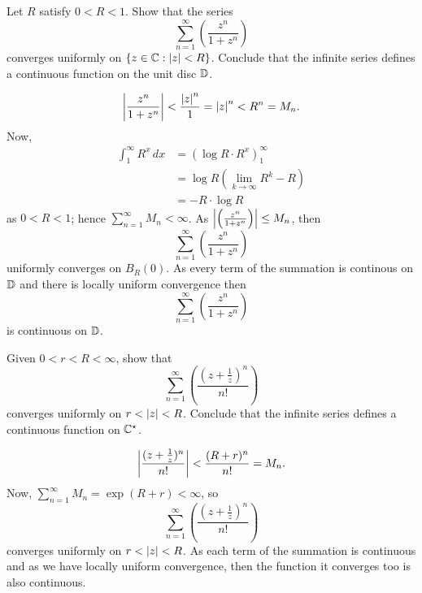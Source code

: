 \setcounter{question}{9}
\question Let $R$ satisfy $0 < R < 1$. 
Show that the series
\[ \sum_{n = 1}^\infty \left(\frac{z^n}{1 + z^n}\right) \]
converges uniformly on $\{ z \in \mathbb{C} : \left\lvert z\right\rvert < R \}$.
Conclude that the infinite series defines a continuous function on the unit disc $\mathbb{D}$.
\begin{solution}
    \[ \left\lvert\frac{z^n}{1 + z^n}\right\rvert < \frac{\left\lvert z\right\rvert^n}1 = \left\lvert z\right\rvert^n < R^n = M_n. \]
    Now,
    \begin{align*}
        \int_1^\infty R^x \, dx &= \left( \log{R} \cdot R^x \right)^\infty_1 \\
        &= \log{R} \left( \lim_{k \to \infty} R^k - R \right) \\
        &= -R \cdot \log{R}
    \end{align*}
    as $0 < R < 1$; hence $\sum_{n = 1}^\infty M_n < \infty$. 
    As $\left\lvert\left(\frac{z^n}{1 + z^n}\right)\right\rvert \leq M_n$, then
    \[ \sum_{n = 1}^\infty \left(\frac{z^n}{1 + z^n}\right) \]
    uniformly converges on $B_R(0)$.
    As every term of the summation is continous on $\mathbb{D}$ and there is locally uniform convergence then
    \[ \sum_{n = 1}^\infty \left(\frac{z^n}{1 + z^n}\right) \]
    is continuous on $\mathbb{D}$.
\end{solution}

\setcounter{question}{11}
\question Given $0 < r < R < \infty$, show that
\[ \sum_{n = 1}^\infty \left( \frac{\left(z + \frac1z\right)^n}{n!}\right) \]
converges uniformly on $r < \left\lvert z\right\rvert < R$.
Conclude that the infinite series defines a continuous function on $\mathbb{C}^\star$.

\begin{solution}
    \[ \left\lvert\frac{(z + \frac1z)^n}{n!}\right\rvert < \frac{(R + r)^n}{n!} = M_n. \]
    Now, $\sum_{n = 1}^\infty M_n = \exp{(R + r)} < \infty$, so 
\[ \sum_{n = 1}^\infty \left( \frac{\left(z + \frac1z\right)^n}{n!}\right) \]
    converges uniformly on $r < \left\lvert z\right\rvert < R$.
    As each term of the summation is continuous and as we have locally uniform convergence,
    then the function it converges too is also continuous. 
\end{solution}
